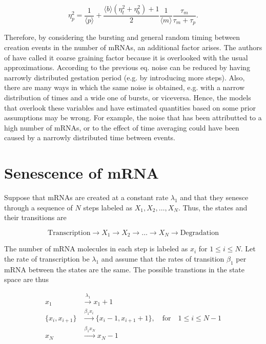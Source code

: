 \begin{equation}
  \eta^2_p = \frac{1}{\langle p\rangle} + \frac{\langle b\rangle(\eta^2_t+\eta^2_b) + 1}{2}\frac{1}{\langle m\rangle}\frac{\tau_m}{\tau_m+\tau_p}.
\end{equation}

Therefore, by considering the bursting and general random timing between creation events in the number of mRNAs, an additional factor arises. The authors of \cite{pedraza08} have called it coarse graining factor because it is overlooked with the usual approximations. According to the previous eq. noise can be reduced by having narrowly distributed gestation period (e.g. by introducing more steps). Also, there are many ways in which the same noise is obtained, e.g. with a narrow distribution of times and a wide one of bursts, or viceversa. Hence, the models that overlook these variables and have estimated quantities based on some prior assumptions may be wrong. For example, the noise that has been attributted to a high number of mRNAs, or to the effect of time averaging could have been caused by a narrowly distributed time between events.

\section{Senescence of mRNA}

Suppose that mRNAs are created at a constant rate $\lambda_1$ and that they senesce through a sequence of $N$ steps labeled as $X_1,X_2,\dotsc,X_N$. Thus, the states and their transitions are

\begin{equation}
  \text{Transcription} \rightarrow X_1 \rightarrow X_2 \rightarrow \dots \rightarrow X_N \rightarrow \text{Degradation}
\end{equation}

The number of mRNA molecules in each step is labeled as $x_i$ for $1\leq i\leq N$. Let the rate of transcription be $\lambda_1$ and assume that the rates of transition $\beta_1$ per mRNA between the states are the same. The possible transtions in the state space are thus

\begin{equation}
  \begin{split}
    x_1&\xrightarrow{\lambda_1}x_1+1\\
    \{x_i,x_{i+1}\}&\xrightarrow{\beta_1x_i} \{x_i-1,x_{i+1}+1\},\quad \text{for}\quad1\leq i\leq N-1\\
    x_N&\xrightarrow{\beta_1x_N} x_N-1
  \end{split}
\end{equation}

